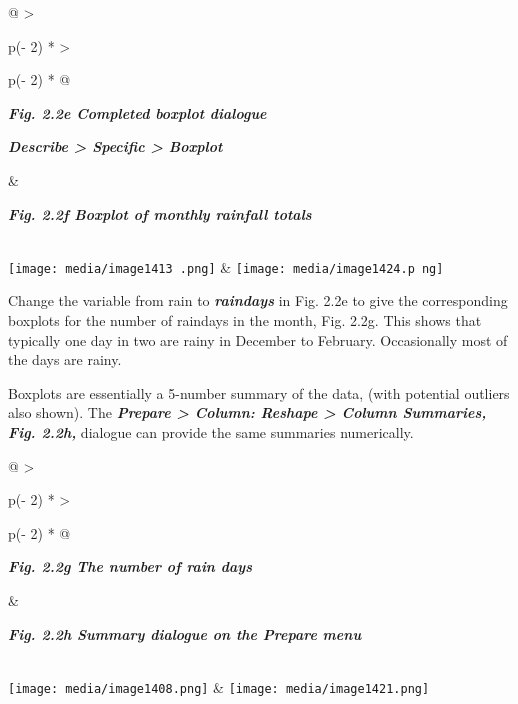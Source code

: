 \documentclass[
  letterpaper,
  DIV=11,
  numbers=noendperiod]{scrreprt}
\begin{document}
\begin{longtable}[]{@{}
  >{\raggedright\arraybackslash}p{(\columnwidth - 2\tabcolsep) * }
  >{\raggedright\arraybackslash}p{(\columnwidth - 2\tabcolsep) * }@{}}
\toprule\noalign{}
\begin{minipage}[b]{\linewidth}\raggedright
\textbf{\emph{Fig. 2.2e Completed boxplot dialogue}}

\textbf{\emph{Describe \textgreater{} Specific \textgreater{} Boxplot}}
\end{minipage} & \begin{minipage}[b]{\linewidth}\raggedright
\textbf{\emph{Fig. 2.2f Boxplot of monthly rainfall totals}}
\end{minipage} \\
\midrule\noalign{}
\endhead
\bottomrule\noalign{}
\endlastfoot
\texttt{[image: media/image1413 .png]}
&
\texttt{[image: media/image1424.p ng]} \\
\end{longtable}

Change the variable from rain to \textbf{\emph{raindays}} in Fig. 2.2e
to give the corresponding boxplots for the number of raindays in the
month, Fig. 2.2g. This shows that typically one day in two are rainy in
December to February. Occasionally most of the days are rainy.

Boxplots are essentially a 5-number summary of the data, (with potential
outliers also shown). The \textbf{\emph{Prepare \textgreater{} Column:
Reshape \textgreater{} Column Summaries, Fig. 2.2h,}} dialogue can
provide the same summaries numerically.

\begin{longtable}[]{@{}
  >{\raggedright\arraybackslash}p{(\columnwidth - 2\tabcolsep) * }
  >{\raggedright\arraybackslash}p{(\columnwidth - 2\tabcolsep) * }@{}}
\toprule\noalign{}
\begin{minipage}[b]{\linewidth}\raggedright
\textbf{\emph{Fig. 2.2g The number of rain days}}
\end{minipage} & \begin{minipage}[b]{\linewidth}\raggedright
\textbf{\emph{Fig. 2.2h Summary dialogue on the Prepare menu}}
\end{minipage} \\
\midrule\noalign{}
\endhead
\bottomrule\noalign{}
\endlastfoot
\texttt{[image: media/image1408.png]} &
\texttt{[image: media/image1421.png]} \\
\end{longtable}
\end{document}
